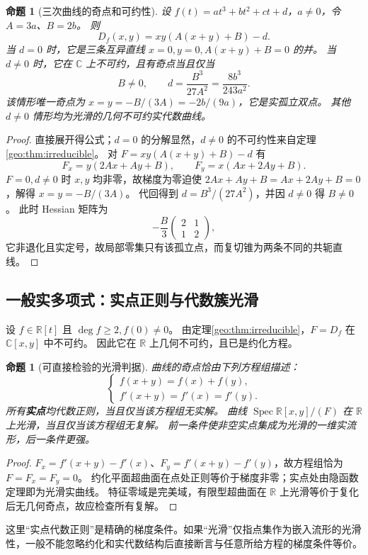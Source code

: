 \documentclass[11pt,a4paper,oneside,openany]{book}
\theoremstyle{lecture}
\newtheorem{proposition}[theorem]{命题}
\newcommand{\R}{\mathbb R}
\newcommand{\C}{\mathbb C}
\numberwithin{equation}{section}
\begin{document}
\begin{proposition}[三次曲线的奇点和可约性]\label{geo:prop:cubic}
设 $f(t)=at^3+bt^2+ct+d$，$a\ne0$，令 $A=3a$、$B=2b$。
则
\[
 D_f(x,y)=xy(A(x+y)+B)-d.
\]
当 $d=0$ 时，它是三条互异直线 $x=0,y=0,A(x+y)+B=0$ 的并。
当 $d\ne0$ 时，它在 $\C$ 上不可约，且有奇点当且仅当
\[
 B\ne0,\qquad d=\frac{B^3}{27A^2}
 =\frac{8b^3}{243a^2}.
\]
该情形唯一奇点为 $x=y=-B/(3A)=-2b/(9a)$，它是实孤立双点。
其他 $d\ne0$ 情形均为光滑的几何不可约实代数曲线。
\end{proposition}
\begin{proof}
直接展开得公式；$d=0$ 的分解显然，$d\ne0$ 的不可约性来自定理\ref{geo:thm:irreducible}。
对 $F=xy(A(x+y)+B)-d$ 有
\[
 F_x=y(2Ax+Ay+B),\qquad F_y=x(Ax+2Ay+B).
\]
$F=0,d\ne0$ 时 $x,y$ 均非零，故梯度为零迫使
$2Ax+Ay+B=Ax+2Ay+B=0$，解得 $x=y=-B/(3A)$。
代回得到 $d=B^3/(27A^2)$，并因 $d\ne0$ 得 $B\ne0$。
此时 Hessian 矩阵为
\[
 -\frac{B}{3}\begin{pmatrix}2&1\\1&2\end{pmatrix},
\]
它非退化且实定号，故局部零集只有该孤立点，而复切锥为两条不同的共轭直线。
\end{proof}

\subsection{一般实多项式：实点正则与代数簇光滑}
设 $f\in\R[t]$ 且 $\deg f\ge2,f(0)\ne0$。
由定理\ref{geo:thm:irreducible}，$F=D_f$ 在 $\C[x,y]$ 中不可约。
因此它在 $\R$ 上几何不可约，且已是约化方程。
\begin{proposition}[可直接检验的光滑判据]\label{geo:prop:smooth}
曲线的奇点恰由下列方程组描述：
\begin{equation}\label{geo:eq:singularsystem}
 \begin{cases}
 f(x+y)=f(x)+f(y),\\
 f'(x+y)=f'(x)=f'(y).
 \end{cases}
\end{equation}
所有\textbf{实点}均代数正则，当且仅当该方程组无实解。
曲线 $\operatorname{Spec}\R[x,y]/(F)$ 在 $\R$ 上光滑，当且仅当该方程组无复解。
前一条件使非空实点集成为光滑的一维实流形，后一条件更强。
\end{proposition}
\begin{proof}
$F_x=f'(x+y)-f'(x)$、$F_y=f'(x+y)-f'(y)$，故方程组恰为 $F=F_x=F_y=0$。
约化平面超曲面在点处正则等价于梯度非零；实点处由隐函数定理即为光滑实曲线。
特征零域是完美域，有限型超曲面在 $\R$ 上光滑等价于复化后无几何奇点，故应检查所有复解。
\end{proof}
这里“实点代数正则”是精确的梯度条件。如果“光滑”仅指点集作为嵌入流形的光滑性，一般不能忽略约化和实代数结构后直接断言与任意所给方程的梯度条件等价。
\end{document}
